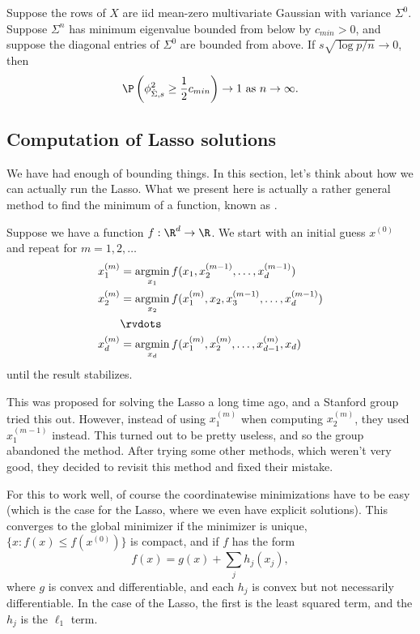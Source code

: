 \documentclass[a4paper]{article}
\DeclareMathOperator*\argmin{argmin}
\begin{document}
\begin{cor}
  Suppose the rows of $X$ are iid mean-zero multivariate Gaussian with variance $\Sigma^0$. Suppose $\Sigma^n$ has minimum eigenvalue bounded from below by $c_{min} > 0$, and suppose the diagonal entries of $\Sigma^0$ are bounded from above. If $s \sqrt{\log p / n} \to 0$, then
  \[
    \P\left(\phi_{\hat{\Sigma}, s}^2 \geq \frac{1}{2} c_{min}\right) \to 1\text{ as }n \to \infty.
  \]
\end{cor}

\subsection{Computation of Lasso solutions}
We have had enough of bounding things. In this section, let's think about how we can actually run the Lasso. What we present here is actually a rather general method to find the minimum of a function, known as .

Suppose we have a function $f: \R^d \to \R$. We start with an initial guess $x^{(0)}$ and repeat for $m = 1, 2, \ldots$
\begin{align*}
  x_1^{(m)} &= \argmin_{x_1} f(x_1, x_2^{(m - 1)}, \ldots, x_d^{(m - 1)})\\
  x_2^{(m)} &= \argmin_{x_2} f(x_1^{(m)}, x_2, x_3^{(m - 1)}, \ldots, x_d^{(m - 1)})\\
  &\rvdots\\
  x_d^{(m)} &= \argmin_{x_d} f(x_1^{(m)}, x_2^{(m)}, \ldots, x_{d - 1}^{(m)}, x_d)
\end{align*}
until the result stabilizes.

This was proposed for solving the Lasso a long time ago, and a Stanford group tried this out. However, instead of using $x_1^{(m)}$ when computing $x_2^{(m)}$, they used $x^{(m - 1)}_1$ instead. This turned out to be pretty useless, and so the group abandoned the method. After trying some other methods, which weren't very good, they decided to revisit this method and fixed their mistake.

For this to work well, of course the coordinatewise minimizations have to be easy (which is the case for the Lasso, where we even have explicit solutions). This converges to the global minimizer if the minimizer is unique, $\{x : f(x) \leq f(x^{(0)})\}$ is compact, and if $f$ has the form
\[
  f(x) = g(x) + \sum_j h_j(x_j),
\]
where $g$ is convex and differentiable, and each $h_j$ is convex but not necessarily differentiable. In the case of the Lasso, the first is the least squared term, and the $h_j$ is the $\ell_1$ term.
\end{document}
